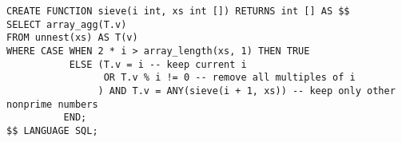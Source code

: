 \begin{verbatim}
CREATE FUNCTION sieve(i int, xs int []) RETURNS int [] AS $$
SELECT array_agg(T.v)
FROM unnest(xs) AS T(v)
WHERE CASE WHEN 2 * i > array_length(xs, 1) THEN TRUE
           ELSE (T.v = i -- keep current i
                 OR T.v % i != 0 -- remove all multiples of i
                ) AND T.v = ANY(sieve(i + 1, xs)) -- keep only other nonprime numbers
          END;
$$ LANGUAGE SQL;
\end{verbatim}